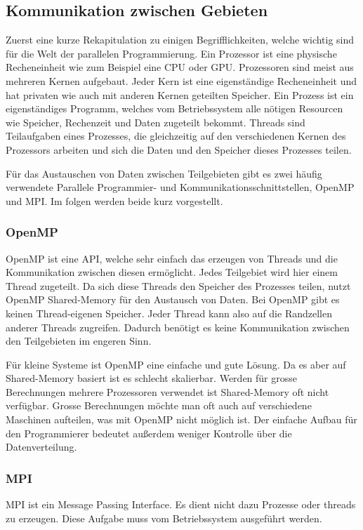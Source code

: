%
%
%
%
\subsection{Kommunikation zwischen Gebieten
\label{parallelisierung:sub:Interprozess}}
Zuerst eine kurze Rekapitulation zu einigen Begrifflichkeiten, welche wichtig sind für die Welt der parallelen Programmierung.
Ein Prozessor ist eine physische Recheneinheit wie zum Beispiel eine CPU oder GPU.
Prozessoren sind meist aus mehreren Kernen aufgebaut.
Jeder Kern ist eine eigenständige Recheneinheit und hat privaten wie auch mit anderen Kernen geteilten Speicher.
Ein Prozess ist ein eigenständiges Programm, welches vom Betriebssystem alle nötigen Resourcen wie Speicher, Rechenzeit und Daten zugeteilt bekommt.
Threads sind Teilaufgaben eines Prozesses, die gleichzeitig auf den verschiedenen Kernen des Prozessors arbeiten und sich die Daten und den Speicher dieses Prozesses teilen.

Für das Austauschen von Daten zwischen Teilgebieten gibt es zwei häufig verwendete Parallele Programmier- und Kommunikationsschnittstellen, OpenMP und MPI.
Im folgen werden beide kurz vorgestellt.

\subsubsection{OpenMP}
OpenMP ist eine API, welche sehr einfach das erzeugen von Threads und die Kommunikation zwischen diesen ermöglicht.
Jedes Teilgebiet wird hier einem Thread zugeteilt. 
Da sich diese Threads den Speicher des Prozesses teilen, nutzt OpenMP Shared-Memory für den Austausch von Daten.
Bei OpenMP gibt es keinen Thread-eigenen Speicher.
Jeder Thread kann also auf die Randzellen anderer Threads zugreifen.
Dadurch benötigt es keine Kommunikation zwischen den Teilgebieten im engeren Sinn.

Für kleine Systeme ist OpenMP eine einfache und gute Lösung.
Da es aber auf Shared-Memory basiert ist es schlecht skalierbar.
Werden für grosse Berechnungen mehrere Prozessoren verwendet ist Shared-Memory oft nicht verfügbar.
Grosse Berechnungen möchte man oft auch auf verschiedene Maschinen aufteilen, was mit OpenMP nicht möglich ist.
Der einfache Aufbau für den Programmierer bedeutet außerdem weniger Kontrolle über die Datenverteilung.

\subsubsection{MPI}
MPI ist ein Message Passing Interface.
Es dient nicht dazu Prozesse oder threads zu erzeugen.
Diese Aufgabe muss vom Betriebssystem ausgeführt werden.


